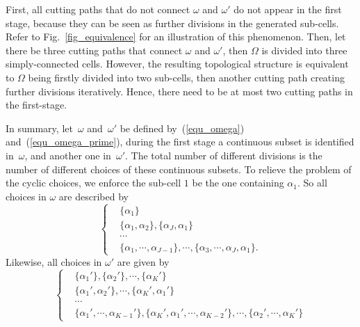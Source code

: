 \documentclass[journal]{IEEEtran}
\begin{document}
First, all cutting paths that do not connect $\omega$ and $\omega'$ do not appear in the first stage, because they can be seen as further divisions in the generated sub-cells. Refer to Fig.~\ref{fig_equivalence} for an illustration of this phenomenon. 
Then, let there be three cutting paths that connect $\omega$ and $\omega'$, then $\Omega$ is divided into three simply-connected cells. However, the resulting topological structure is equivalent to $\Omega$ being firstly divided into two sub-cells, then another cutting path creating further divisions iteratively. Hence, there need to be at most two cutting paths in the first-stage.  

In summary, let~$\omega$ and~$\omega'$ be defined by~(\ref{equ_omega}) and~(\ref{equ_omega_prime}), during the first stage a continuous 
subset is identified in~$\omega$, and another one in~$\omega'$. The total number of different divisions is the number of different choices of these continuous subsets. To relieve the problem of the cyclic choices, we enforce the sub-cell $1$ be the one containing $\alpha_1$. 
So all choices in $\omega$ are described by
\begin{equation}\label{equ_all_omega}
\left\{
\begin{aligned}
&\{\alpha_1\}\\
&\{\alpha_1, \alpha_2\}, \{\alpha_J, \alpha_1\}\\
&\cdots\\
&\{\alpha_1, \cdots, \alpha_{J-1}\}, \cdots, \{\alpha_3, \cdots, \alpha_J, \alpha_1\}.
\end{aligned}
\right.
\end{equation}
Likewise, all choices in $\omega'$ are given by
\begin{equation}\label{equ_all_omega_prime}
\left\{
\begin{aligned}
&\{\alpha_1'\}, \{\alpha_2'\}, \cdots, \{\alpha_K'\}\\
&\{\alpha_1', \alpha_2'\}, \cdots, \{\alpha_K', \alpha_1'\}\\
&\cdots\\
&\{\alpha_1', \cdots, \alpha_{K-1}'\}, \{\alpha_K', \alpha_1', \cdots, \alpha_{K-2}'\}, \cdots, \{\alpha_2', \cdots, \alpha_K'\}
\end{aligned}
\right.
\end{equation}
\end{document}
